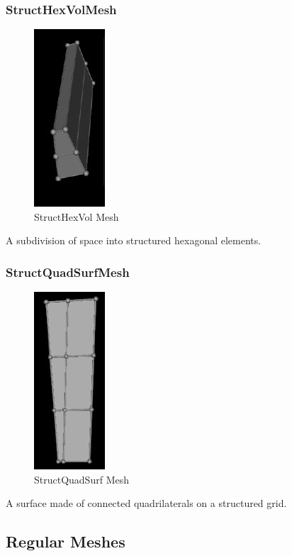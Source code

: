 \documentclass[fleqn,12pt,openany]{book}
\begin{document}
\subsubsection{StructHexVolMesh}
\begin{figure}[H]\label{structhexvolmesh}
\includegraphics{UserGuide_figures/StructHexVol.png}
\caption{StructHexVol Mesh}
\end{figure}

A subdivision of space into structured hexagonal elements.

\subsubsection{StructQuadSurfMesh}
\begin{figure}[H]\label{structquadsurfmesh}
\includegraphics{UserGuide_figures/StructQuadSurf.png}
\caption{StructQuadSurf Mesh}
\end{figure}

A surface made of connected quadrilaterals on a structured grid.

\subsection{Regular Meshes}
\end{document}
